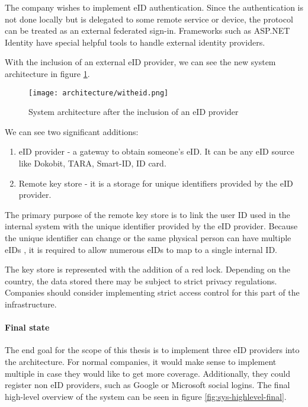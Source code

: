 The company wishes to implement eID authentication. Since the authentication is not done locally but is delegated to some remote service or device, the protocol can be treated as an external federated sign-in. Frameworks such as ASP.NET Identity have special helpful tools to handle external identity providers.

With the inclusion of an external eID provider, we can see the new system architecture in figure \ref{fig:sys-highlevel-witheid}.

\begin{figure}
  \centering
  \texttt{[image: architecture/witheid.png]}
  \caption{System architecture after the inclusion of an eID provider}
  \label{fig:sys-highlevel-witheid}
\end{figure}

We can see two significant additions:

\begin{enumerate}
  \item eID provider - a gateway to obtain someone's eID. It can be any eID source like Dokobit, TARA, Smart-ID, ID card.
  \item Remote key store - it is a storage for unique identifiers provided by the eID provider.
\end{enumerate}

The primary purpose of the remote key store is to link the user ID used in the internal system with the unique identifier provided by the eID provider. Because the unique identifier can change or the same physical person can have multiple eIDs \cite{eidas-saml}, it is required to allow numerous eIDs to map to a single internal ID.

The key store is represented with the addition of a red lock. Depending on the country, the data stored there may be subject to strict privacy regulations. Companies should consider implementing strict access control for this part of the infrastructure.

\paragraph{Final state}

The end goal for the scope of this thesis is to implement three eID providers into the architecture. For normal companies, it would make sense to implement multiple in case they would like to get more coverage. Additionally, they could register non eID providers, such as Google or Microsoft social logins. The final high-level overview of the system can be seen in figure \ref{fig:sys-highlevel-final}.


